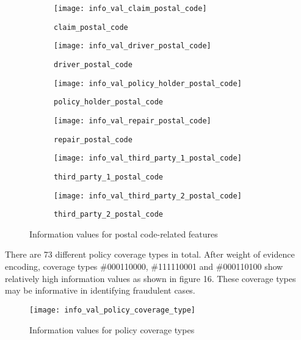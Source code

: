 \documentclass[12pt]{article}
\begin{document}
\begin{figure}[h]
\centering
\begin{subfigure}{.5\textwidth}
  \centering
  \texttt{[image: info\_val\_claim\_postal\_code]}
  \caption{\texttt{claim\_postal\_code}}
  \label{fig:sub1}
\end{subfigure}%
\begin{subfigure}{.5\textwidth}
  \centering
  \texttt{[image: info\_val\_driver\_postal\_code]}
  \caption{\texttt{driver\_postal\_code}}
  \label{fig:sub2}
\end{subfigure}
\vspace{0.5cm}

\begin{subfigure}{.5\textwidth}
  \centering
  \texttt{[image: info\_val\_policy\_holder\_postal\_code]}
  \caption{\texttt{policy\_holder\_postal\_code}}
  \label{fig:sub3}
\end{subfigure}%
\begin{subfigure}{.5\textwidth}
  \centering
  \texttt{[image: info\_val\_repair\_postal\_code]}
  \caption{\texttt{repair\_postal\_code}}
  \label{fig:sub4}
\end{subfigure}
\vspace{0.5cm}

\begin{subfigure}{.5\textwidth}
  \centering
  \texttt{[image: info\_val\_third\_party\_1\_postal\_code]}
  \caption{\texttt{third\_party\_1\_postal\_code}}
  \label{fig:sub5}
\end{subfigure}%
\begin{subfigure}{.5\textwidth}
  \centering
  \texttt{[image: info\_val\_third\_party\_2\_postal\_code]}
  \caption{\texttt{third\_party\_2\_postal\_code}}
  \label{fig:sub6}
\end{subfigure}
\caption{Information values for postal code-related features}
\label{fig:iv_postal_code}
\end{figure}

\clearpage

There are 73 different policy coverage types in total. After weight of evidence encoding, coverage types \#000110000, \#111110001 and \#000110100 show relatively high information values as shown in figure 16. These coverage types may be informative in identifying fraudulent cases.

\begin{figure}[h]
\centering
\texttt{[image: info\_val\_policy\_coverage\_type]}
\caption{Information values for policy coverage types}
\end{figure}
\end{document}
